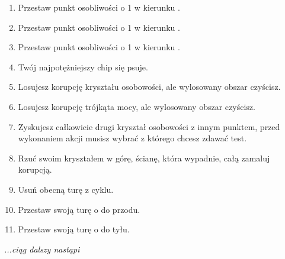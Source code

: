 \begin{enumerate}
	\item Przestaw punkt osobliwości o 1 w kierunku \aba{}.
	\item Przestaw punkt osobliwości o 1 w kierunku \abt{}.
	\item Przestaw punkt osobliwości o 1 w kierunku \abh{}.
	\item Twój najpotężniejszy chip się psuje.
	\item Losujesz korupcję kryształu osobowości, ale wylosowany obszar czyścisz.
	\item Losujesz korupcję trójkąta mocy, ale wylosowany obszar czyścisz.
	\item Zyskujesz całkowicie drugi kryształ osobowości z innym punktem, przed wykonaniem akcji musisz wybrać z którego chcesz zdawać test.
	\item Rzuć swoim kryształem w górę, ścianę, która wypadnie, całą zamaluj korupcją.
	\item Usuń obecną turę z cyklu.
	\item Przestaw swoją turę o \dvi{} do przodu.
	\item Przestaw swoją turę o \dvi{} do tyłu.
\end{enumerate}
\emph{...ciąg dalszy nastąpi}

